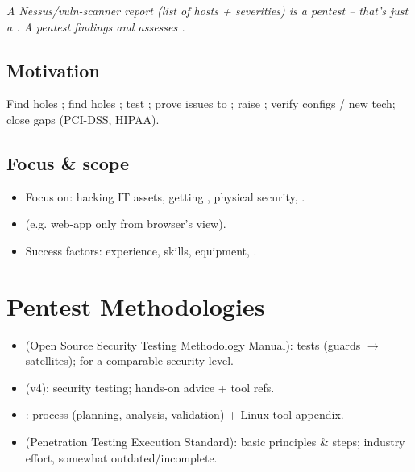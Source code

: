 \textit{ A Nessus/vuln-scanner report (list of hosts + severities) is  a pentest -- that's just a . A pentest  findings and assesses .}

\subsection{Motivation}
Find holes ; find holes ; test ; prove issues to ; raise ; verify configs / new tech; close  gaps (PCI-DSS, HIPAA).

\subsection{Focus \& scope}
\begin{itemize}
\item Focus on: hacking IT assets, getting , physical security, .
\item {} (e.g. web-app only from browser's view).
\item Success factors: experience, skills, equipment, .
\end{itemize}

\section{Pentest Methodologies}
\begin{itemize}
\item {} (Open Source Security Testing Methodology Manual): tests  (guards $\to$ satellites);  for a comparable security level.
\item {} (v4):  security testing; hands-on advice + tool refs.
\item {}: process (planning, analysis, validation) + Linux-tool appendix.
\item {} (Penetration Testing Execution Standard): basic principles \& steps; industry effort, somewhat outdated/incomplete.
\end{itemize}

